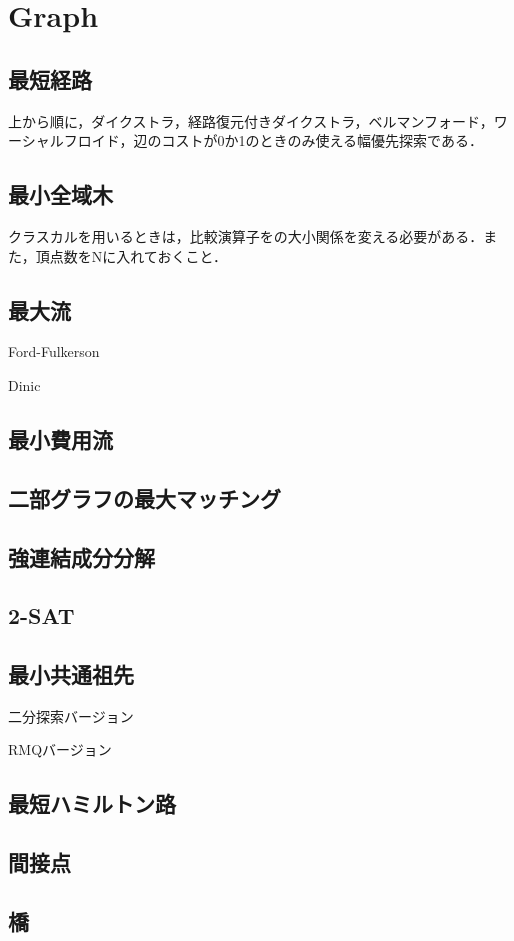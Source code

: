 \section{Graph}

\subsection{最短経路}
上から順に，ダイクストラ，経路復元付きダイクストラ，ベルマンフォード，ワーシャルフロイド，辺のコストが0か1のときのみ使える幅優先探索である．


\subsection{最小全域木}
クラスカルを用いるときは，比較演算子をの大小関係を変える必要がある．また，頂点数をNに入れておくこと．


\subsection{最大流}
Ford-Fulkerson

Dinic


\subsection{最小費用流}


\subsection{二部グラフの最大マッチング}


\subsection{強連結成分分解}


\subsection{2-SAT}


\subsection{最小共通祖先}
二分探索バージョン

RMQバージョン


\subsection{最短ハミルトン路}


\subsection{間接点}


\subsection{橋}

